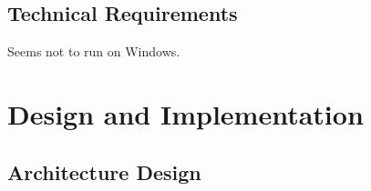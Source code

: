 \documentclass[12pt,a4paper]{article}
\begin{document}
\subsection{Technical Requirements} \label{subsection:technicalrequirements}

Seems not to run on Windows.





%
%
%
%
%
%
%
%
\newpage
\section{Design and Implementation} \label{section:designandimplementation}







\subsection{Architecture Design} \label{subsection:architecturedesign}

\end{document}
